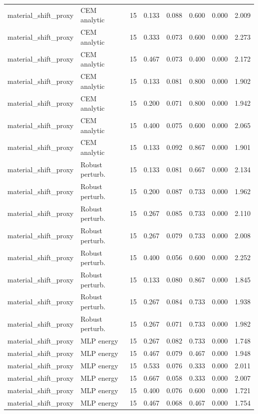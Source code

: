 {\begin{longtable}{llrrrrrr}
material\_shift\_proxy & CEM analytic & 15 & 0.133 & 0.088 & 0.600 & 0.000 & 2.009 \\
material\_shift\_proxy & CEM analytic & 15 & 0.333 & 0.073 & 0.600 & 0.000 & 2.273 \\
material\_shift\_proxy & CEM analytic & 15 & 0.467 & 0.073 & 0.400 & 0.000 & 2.172 \\
material\_shift\_proxy & CEM analytic & 15 & 0.133 & 0.081 & 0.800 & 0.000 & 1.902 \\
material\_shift\_proxy & CEM analytic & 15 & 0.200 & 0.071 & 0.800 & 0.000 & 1.942 \\
material\_shift\_proxy & CEM analytic & 15 & 0.400 & 0.075 & 0.600 & 0.000 & 2.065 \\
material\_shift\_proxy & CEM analytic & 15 & 0.133 & 0.092 & 0.867 & 0.000 & 1.901 \\
material\_shift\_proxy & Robust perturb. & 15 & 0.133 & 0.081 & 0.667 & 0.000 & 2.134 \\
material\_shift\_proxy & Robust perturb. & 15 & 0.200 & 0.087 & 0.733 & 0.000 & 1.962 \\
material\_shift\_proxy & Robust perturb. & 15 & 0.267 & 0.085 & 0.733 & 0.000 & 2.110 \\
material\_shift\_proxy & Robust perturb. & 15 & 0.267 & 0.079 & 0.733 & 0.000 & 2.008 \\
material\_shift\_proxy & Robust perturb. & 15 & 0.400 & 0.056 & 0.600 & 0.000 & 2.252 \\
material\_shift\_proxy & Robust perturb. & 15 & 0.133 & 0.080 & 0.867 & 0.000 & 1.845 \\
material\_shift\_proxy & Robust perturb. & 15 & 0.267 & 0.084 & 0.733 & 0.000 & 1.938 \\
material\_shift\_proxy & Robust perturb. & 15 & 0.267 & 0.071 & 0.733 & 0.000 & 1.982 \\
material\_shift\_proxy & MLP energy & 15 & 0.267 & 0.082 & 0.733 & 0.000 & 1.748 \\
material\_shift\_proxy & MLP energy & 15 & 0.467 & 0.079 & 0.467 & 0.000 & 1.948 \\
material\_shift\_proxy & MLP energy & 15 & 0.533 & 0.076 & 0.333 & 0.000 & 2.011 \\
material\_shift\_proxy & MLP energy & 15 & 0.667 & 0.058 & 0.333 & 0.000 & 2.007 \\
material\_shift\_proxy & MLP energy & 15 & 0.400 & 0.076 & 0.600 & 0.000 & 1.721 \\
material\_shift\_proxy & MLP energy & 15 & 0.467 & 0.068 & 0.467 & 0.000 & 1.754 \\

\end{longtable}}
